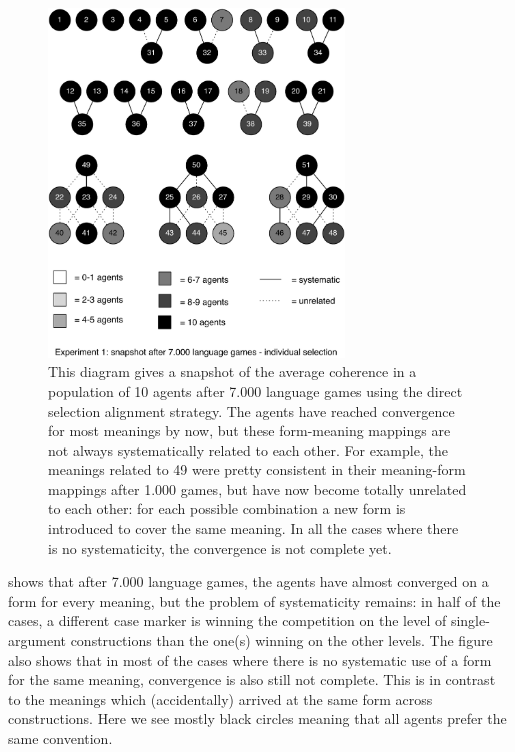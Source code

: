 \begin{figure}[p]
\centerline{\includegraphics[width=0.7\textwidth]{Chapter4/figs/direct-coherence-no-analogy-7000}}
  \caption[Experiment 1: snapshot after 7.000 games]{This diagram gives a snapshot of the average coherence in a population of 10 agents after 7.000 language games using the direct selection alignment strategy. The agents have reached convergence for most meanings by now, but these form-meaning mappings are not always systematically related to each other. For example, the meanings related to 49 were pretty consistent in their meaning-form mappings after 1.000 games, but have now become totally unrelated to each other: for each possible combination a new form is introduced to cover the same meaning. In all the cases where there is no systematicity, the convergence is not complete yet.}
   \label{f:1-coherence-7000}
\end{figure}

 shows that after 7.000 language games, the agents have almost converged on a form for every meaning, but the problem of systematicity remains: in half of the cases, a different case marker is winning the competition on the level of single-argument constructions than the one(s) winning on the other levels. The figure also shows that in most of the cases where there is no systematic use of a form for the same meaning, convergence is also still not complete. This is in contrast to the meanings which (accidentally) arrived at the same form across constructions. Here we see mostly black circles meaning that all agents prefer the same convention.



